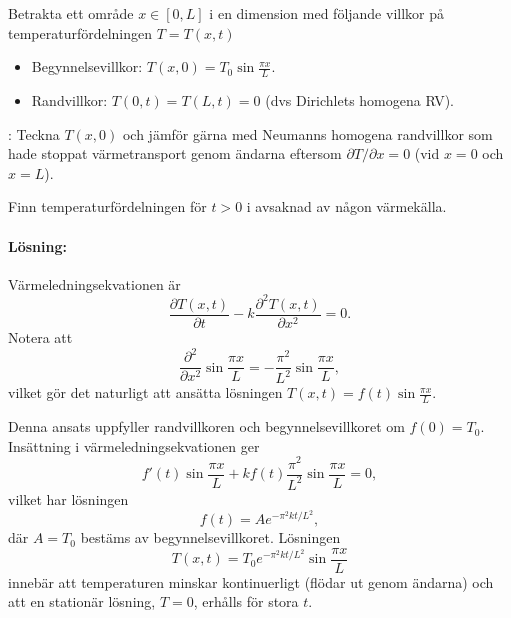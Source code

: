\documentclass[%
oneside,                 %
final,                   %
10pt]{article}
\newcommand{\longinlinecomment}[3]{{\color{red}{\bf #1}: #2}}
\newenvironment{notice_mdfboxadmon}[1][]{
\begin{notice_mdfboxmdframed}[frametitle=#1]
}
{
\end{notice_mdfboxmdframed}
}
\begin{document}
\begin{notice_mdfboxadmon}

Betrakta ett område $x \in [0,L]$ i en dimension med följande villkor på temperaturfördelningen $T = T(x,t)$
\begin{itemize}
\item Begynnelsevillkor: $T(x,0) = T_0 \sin \frac{\pi x}{L}$.

\item Randvillkor: $T(0,t) = T(L,t) = 0$ (dvs Dirichlets homogena RV).
\end{itemize}

\noindent
\longinlinecomment{Kommentar 2}{ Teckna $T(x,0)$ och jämför gärna med Neumanns homogena randvillkor som hade stoppat värmetransport genom ändarna eftersom $\partial T / \partial x = 0$ (vid $x=0$ och $x=L$). }{ Teckna $T(x,0)$ och jämför }

Finn temperaturfördelningen för $t > 0$ i avsaknad av någon värmekälla.

\paragraph{Lösning:}
Värmeledningsekvationen är
$$
\frac{\partial T(x,t)}{\partial t} - k \frac{\partial^2 T(x,t)}{\partial x^2} = 0.
$$
Notera att 
$$
\frac{\partial^2}{\partial x^2} \sin \frac{\pi x}{L} = - \frac{\pi^2}{L^2} \sin \frac{\pi x}{L},
$$
vilket gör det naturligt att ansätta lösningen $T(x,t) = f(t) \sin \frac{\pi x}{L}$.

Denna ansats uppfyller randvillkoren och begynnelsevillkoret om $f(0) = T_0$. Insättning i värmeledningsekvationen ger
$$
f'(t) \sin \frac{\pi x}{L} + k f(t) \frac{\pi^2}{L^2} \sin \frac{\pi x}{L} = 0,
$$
vilket har lösningen
$$
f(t) = A e^{-\pi^2 k t / L^2},
$$
där $A = T_0$ bestäms av begynnelsevillkoret. Lösningen 
$$
T(x,t) = T_0 e^{-\pi^2 k t / L^2} \sin \frac{\pi x}{L}
$$
innebär att temperaturen minskar kontinuerligt (flödar ut genom ändarna) och att en stationär lösning, $T=0$, erhålls för stora $t$.
\end{notice_mdfboxadmon} %
\end{document}
